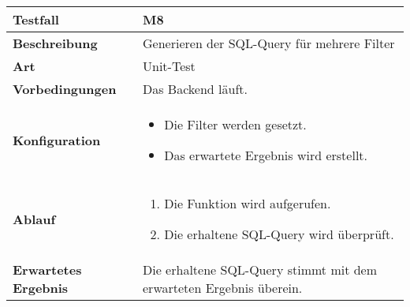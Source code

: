 \begin{longtable}{p{}|p{}}
	\hline
	\textbf{Testfall}               & \textbf{M8} \\
	\hline
	\textbf{Beschreibung}   		& Generieren der SQL-Query für mehrere Filter \\
	\hline
	\textbf{Art}    				& Unit-Test \\
	\hline
	\textbf{Vorbedingungen}    		& Das Backend läuft. \\
	\hline
	\textbf{Konfiguration}   	 	& 
	\begin{itemize}
		\item Die Filter werden gesetzt.
		\item Das erwartete Ergebnis wird erstellt.
	\end{itemize} \\
	\hline
	\textbf{Ablauf}    				& 
	\begin{enumerate}
		\item Die Funktion wird aufgerufen.
		\item Die erhaltene SQL-Query wird überprüft.
	\end{enumerate} \\
	\hline
	\textbf{Erwartetes Ergebnis}    & Die erhaltene SQL-Query stimmt mit dem erwarteten Ergebnis überein. \\
	\hline
\end{longtable}\label{tab:testfall-M8}

\newpage